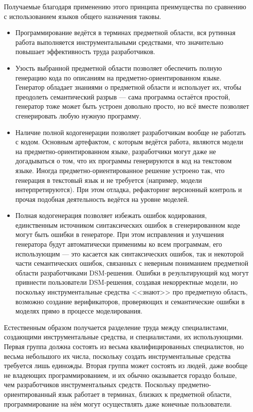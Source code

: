 Получаемые благодаря применению этого принципа преимущества по сравнению с 
использованием языков общего назначения таковы.
\begin{itemize}
	\item Программирование ведётся в терминах предметной области, вся рутинная 
		работа выполняется инструментальными средствами, что значительно повышает 
		эффективность труда разработчиков.
	\item Узость выбранной предметной области позволяет обеспечить полную 
		генерацию кода по описаниям на предметно-ориентированном языке. Генератор 
		обладает знаниями о предметной области и использует их, чтобы преодолеть 
		семантический разрыв --- сама программа остаётся простой, генератор тоже 
		может быть устроен довольно просто, но всё вместе позволяет сгенерировать 
		любую нужную программу.
	\item Наличие полной кодогенерации позволяет разработчикам вообще не работать 
		с кодом. Основным артефактом, с которым ведётся работа, являются модели на 
		предметно-ориентированном языке, разработчики могут даже не догадываться о 
		том, что их программы генерируются в код на текстовом языке. Иногда 
		предметно-ориентированное решение устроено так, что генерация в текстовый 
		язык и не требуется (например, модели интерпретируются). При этом отладка, рефакторинг
		версионный контроль и прочая подобная деятельность ведётся на уровне моделей.
	\item Полная кодогенерация позволяет избежать ошибок кодирования, единственным 
		источником синтаксических ошибок в сгенерированном коде могут быть ошибки в 
		генераторе. При этом исправления и улучшения генератора будут автоматически 
		применимы ко всем программам, его использующим --- это касается как синтаксических ошибок,
		так и некоторой части семантических ошибок, связанных с неверным пониманием предметной области
		разработчиками DSM-решения. Ошибки в результирующий код могут привнести пользователи
		DSM-решения, создавая некорректные модели, но поскольку инструментальные средства 
		<<знают>> про предметную область, возможно создание верификаторов, проверяющих 
		и семантические ошибки в моделях прямо в процессе моделирования.
\end{itemize}

Естественным образом получается разделение труда между специалистами, 
создающими инструментальные средства, и специалистами, их использующими. 
Первая группа должна состоять из весьма квалифицированных специалистов, но 
весьма небольшого их числа, поскольку создать инструментальные средства 
требуется лишь единожды. Вторая группа может состоять из людей, даже вообще не 
владеющих программированием, и их обычно оказывается гораздо больше, чем 
разработчиков инструментальных средств. Поскольку предметно-ориентированный язык 
работает в терминах, близких к предметной области, программирование на нём могут 
осуществлять даже конечные пользователи.

